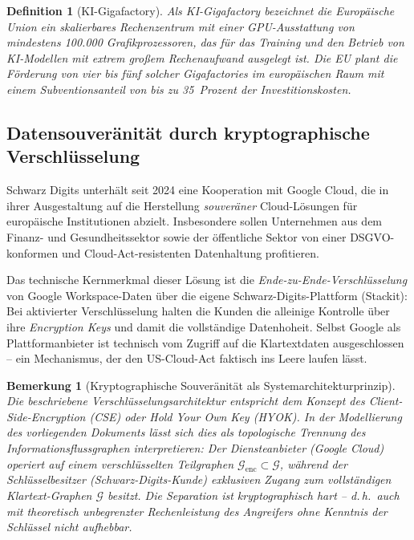 \documentclass[12pt, a4paper, openany]{report}
\newtheorem{definition}[theorem]{Definition}
\newtheorem{remark}[theorem]{Bemerkung}
\newcommand{\calG}{\mathcal{G}}
\begin{document}
\begin{definition}[KI-Gigafactory]
	\label{def:gigafactory}
	Als \emph{KI-Gigafactory} bezeichnet die Europäische Union ein
	skalierbares Rechenzentrum mit einer GPU-Ausstattung von mindestens
	100.000 Grafikprozessoren, das für das Training und den Betrieb von
	KI-Modellen mit extrem großem Rechenaufwand ausgelegt ist. Die EU plant
	die Förderung von vier bis fünf solcher Gigafactories im europäischen Raum
	mit einem Subventionsanteil von bis zu 35~Prozent der Investitionskosten.
\end{definition}

\subsection{Datensouveränität durch kryptographische Verschlüsselung}

Schwarz Digits unterhält seit 2024 eine Kooperation mit Google Cloud, die
in ihrer Ausgestaltung auf die Herstellung \emph{souveräner} Cloud-Lösungen
für europäische Institutionen abzielt. Insbesondere sollen Unternehmen
aus dem Finanz- und Gesundheitssektor sowie der öffentliche Sektor
von einer DSGVO-konformen und Cloud-Act-resistenten Datenhaltung profitieren.

Das technische Kernmerkmal dieser Lösung ist die \emph{Ende-zu-Ende-Verschlüsselung}
von Google Workspace-Daten über die eigene Schwarz-Digits-Plattform (Stackit):
Bei aktivierter Verschlüsselung halten die Kunden die alleinige Kontrolle
über ihre \textit{Encryption Keys} und damit die vollständige Datenhoheit.
Selbst Google als Plattformanbieter ist technisch vom Zugriff auf die
Klartextdaten ausgeschlossen -- ein Mechanismus, der den US-Cloud-Act
faktisch ins Leere laufen lässt.

\begin{remark}[Kryptographische Souveränität als Systemarchitekturprinzip]
	\label{rem:crypto_sovereignty}
	Die beschriebene Verschlüsselungsarchitektur entspricht dem Konzept des
	\emph{Client-Side-Encryption} (CSE) oder \emph{Hold Your Own Key} (HYOK).
	In der Modellierung des vorliegenden Dokuments lässt sich dies als
	topologische Trennung des Informationsflussgraphen interpretieren: Der
	Diensteanbieter (Google Cloud) operiert auf einem verschlüsselten
	Teilgraphen $\calG_{\text{enc}} \subset \calG$, während der
	Schlüsselbesitzer (Schwarz-Digits-Kunde) exklusiven Zugang zum
	vollständigen Klartext-Graphen $\calG$ besitzt. Die Separation ist
	kryptographisch hart -- d.\,h.\ auch mit theoretisch unbegrenzter
	Rechenleistung des Angreifers ohne Kenntnis der Schlüssel nicht aufhebbar.
\end{remark}
\end{document}

